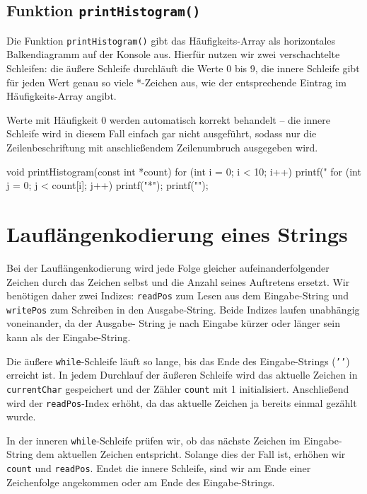 \section*{Funktion \texttt{printHistogram()}}

Die Funktion \texttt{printHistogram()} gibt das Häufigkeits-Array als
horizontales Balkendiagramm auf der Konsole aus. Hierfür nutzen wir zwei
verschachtelte Schleifen: die äußere Schleife durchläuft die Werte 0 bis 9,
die innere Schleife gibt für jeden Wert genau so viele *-Zeichen aus, wie der
entsprechende Eintrag im Häufigkeits-Array angibt.

Werte mit Häufigkeit 0 werden automatisch korrekt behandelt -- die innere
Schleife wird in diesem Fall einfach gar nicht ausgeführt, sodass nur die
Zeilenbeschriftung mit anschließendem Zeilenumbruch ausgegeben wird.

\begin{codebox}[lang=c, fontsize=\small]
void printHistogram(const int *count) {
    for (int i = 0; i < 10; i++) {
        printf("%
        for (int j = 0; j < count[i]; j++) {
            printf("*");
        }
        printf("\n");
    }
}
\end{codebox}




\chapter{Lauflängenkodierung eines Strings}

Bei der Lauflängenkodierung wird jede Folge gleicher aufeinanderfolgender
Zeichen durch das Zeichen selbst und die Anzahl seines Auftretens ersetzt.
Wir benötigen daher zwei Indizes: \texttt{readPos} zum Lesen aus dem
Eingabe-String und \texttt{writePos} zum Schreiben in den
Ausgabe-String. Beide Indizes laufen unabhängig voneinander, da der Ausgabe-
String je nach Eingabe kürzer oder länger sein kann als der Eingabe-String.

Die äußere \texttt{while}-Schleife läuft so lange, bis das Ende des
Eingabe-Strings (\texttt{'\0'}) erreicht ist. In jedem Durchlauf der
äußeren Schleife wird das aktuelle Zeichen in \texttt{currentChar}
gespeichert und der Zähler \texttt{count} mit 1 initialisiert.
Anschließend wird der \texttt{readPos}-Index erhöht, da das aktuelle
Zeichen ja bereits einmal gezählt wurde.

In der inneren \texttt{while}-Schleife prüfen wir, ob das nächste
Zeichen im Eingabe-String dem aktuellen Zeichen entspricht. Solange dies der
Fall ist, erhöhen wir \texttt{count} und \texttt{readPos}.
Endet die innere Schleife, sind wir am Ende einer Zeichenfolge angekommen
oder am Ende des Eingabe-Strings.

